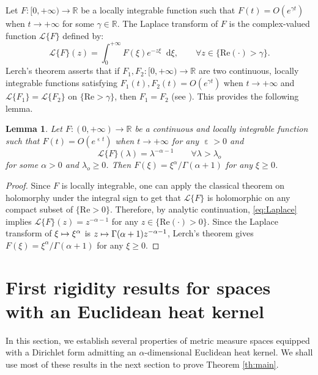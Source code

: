 \documentclass[10pt]{amsart}
\newcommand\mto{\mathchoice{\longmapsto}{\mapsto}{\mapsto}{\mapsto}}
\theoremstyle{plain}
\newtheorem{lemma}[theorem]{Lemma}
\theoremstyle{definition}
\newcommand{\setR}{\mathbb{R}}
\let\eps\upepsilon
\newcommand{\di}{\mathop{}\!\mathrm{d}}
\begin{document}
Let $F:[0,+\infty)\to \setR$ be a locally integrable function such that $F(t)=O(e^{\gamma t})$ when $t \to +\infty$ for some $\gamma \in \setR$. The Laplace transform of $F$ is the complex-valued function $\mathcal{L}\{F\}$ defined by:
\[
\mathcal{L}\{F\}(z) = \int_0^{+\infty} F(\xi)e^{-z\xi}\di \xi, \qquad \forall z \in \{\mathrm{Re}(\cdot) > \gamma\}.
\]
Lerch's theorem asserts that if $F_1, F_2: [0,+\infty)\to\setR$ are two continuous, locally integrable functions satisfying $F_1(t), F_2(t)=O(e^{\gamma t})$ when $t \to +\infty$ and $\mathcal{L}\{F_1\} = \mathcal{L}\{F_2\}$ on $\{\mathrm{Re}>\gamma\}$, then $F_1=F_2$ (see \eg \cite[Th.\,2.1]{Cohen}). This provides the following lemma.

\begin{lemma}\label{lem:Laplace}
Let $F:(0,+\infty)\to \setR$ be a continuous and locally integrable function such that $F(t)=O(e^{\eps t})$ when $t \to +\infty$ for any $\eps>0$ and
\begin{equation}\label{eq:Laplace}
\mathcal{L}\{F\}(\lambda) = \lambda^{-\alpha-1} \qquad \forall \lambda >\lambda_o
\end{equation}
for some $\alpha>0$ and $\lambda_o \ge 0$. Then $F(\xi)=\xi^\alpha/\Gamma(\alpha+1)$ for any $\xi\ge0$.
\end{lemma}

\begin{proof}
Since $F$ is locally integrable, one can apply the classical theorem on holomorphy under the integral sign to get that $\mathcal{L}\{F\}$ is holomorphic on any compact subset of $\{\mathrm{Re}>0\}$. Therefore, by analytic continuation, \eqref{eq:Laplace} implies $\mathcal{L}\{F\}(z) = z^{-\alpha-1}$ for any $z \in \{ \mathrm{Re}(\cdot)>0\}$. Since the Laplace transform of $\xi \mto \xi^{\alpha}$ is $z\mto \Gamma(\alpha +1) z^{-\alpha-1}$, Lerch's theorem gives $F(\xi)=\xi^\alpha/\Gamma(\alpha+1)$ for any $\xi\ge0$.
\end{proof}

\section{First rigidity results for spaces with an Euclidean heat kernel}\label{sec:3}

In this section, we establish several properties of metric measure spaces equipped with a Dirichlet form admitting an $\alpha$-dimensional Euclidean heat kernel. We shall use most of these results in the next section to prove Theorem \ref{th:main}.
\end{document}
